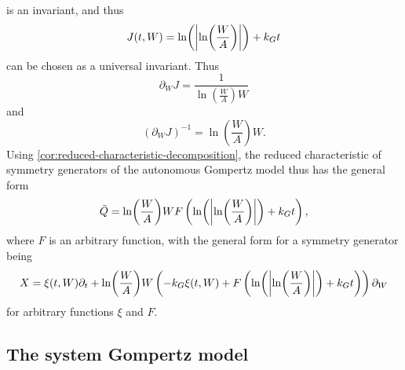 is an invariant, and thus
\begin{equation}
  J(t, W) = \ln(\abs{\ln(\frac{W}{A})}) + k_G t
\end{equation}
can be chosen as a universal invariant.
Thus
\begin{equation}
  \partial_W J = \frac{1}{\ln(\frac{W}{A}) W}
\end{equation}
and
\begin{equation}
  \left(\partial_W J\right)^{-1} = \ln(\frac{W}{A}) W.
\end{equation}
Using \cref{cor:reduced-characteristic-decomposition}, the reduced characteristic of symmetry generators of the autonomous Gompertz model thus has the general form
\begin{equation} \label{eq:general-autonomous-gompertz-characteristic}
  \bar{Q} = \ln(\frac{W}{A}) W F\left(\ln(\abs{\ln(\frac{W}{A})}) + k_G t\right),
\end{equation}
where \(F\) is an arbitrary function, with the general form for a symmetry generator being
\begin{equation} \label{eq:general-autonomous-gompertz-symmetry}
  X = \xi(t, W) \partial_t + \ln(\frac{W}{A}) W \left(-k_G \xi(t, W) + F\left(\ln(\abs{\ln(\frac{W}{A})}) + k_G t\right)\right) \partial_W
\end{equation}
for arbitrary functions \(\xi\) and \(F\).

\subsection{The system Gompertz model}

